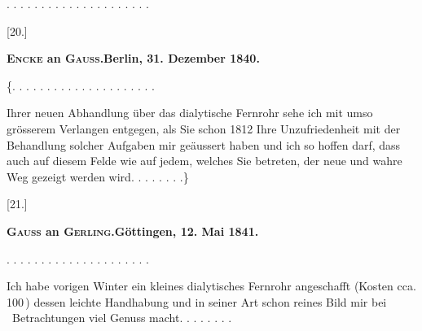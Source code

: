 \par\noindent . . . . . . . . . . . . . . . . . . . . .
\begin{center}
[20.]\par\medskip
\textbf{\textsc{Encke} an \textsc{Gauss}.\quad Berlin, 31. Dezember 1840.}
\end{center}
\noindent \{. . . . . . . . . . . . . . . . . . . . .\par
\noindent\hspace*{\parindent}Ihrer neuen Abhandlung über das dialytische Fernrohr sehe ich mit umso grösserem Verlangen entgegen, als Sie schon 1812 Ihre Unzufriedenheit mit der Behandlung solcher Aufgaben mir geäussert haben und ich so hoffen darf, dass auch auf diesem Felde wie auf jedem, welches Sie betreten, der neue und wahre Weg gezeigt werden wird. . . . . . . .\}
\begin{center}
[21.]\par\medskip
\textbf{\textsc{Gauss} an \textsc{Gerling}.\quad Göttingen, 12. Mai 1841.}
\end{center}
\noindent . . . . . . . . . . . . . . . . . . . . .\par
\noindent\hspace*{\parindent}Ich habe vorigen Winter ein kleines dialytisches Fernrohr angeschafft (Kosten cca. 100\,\DioptrikCurrencyTwentyOne) dessen leichte Handhabung und in seiner Art schon reines Bild mir bei \DioptrikMoonTwentyOne\ Betrachtungen viel Genuss macht. . . . . . . .
\clearpage\endgroup
